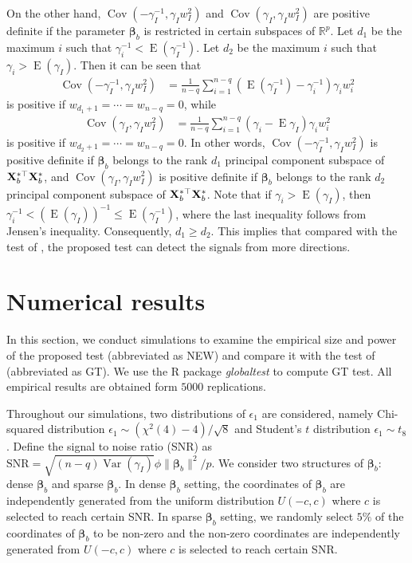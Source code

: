 \documentclass[11pt]{article}
\DeclareMathOperator{\myE}{E}
\DeclareMathOperator{\myVar}{Var}
\DeclareMathOperator{\myCov}{Cov}
\newcommand{\bfsym}[1]{\ensuremath{\boldsymbol{#1}}}
\def\bbeta{\bfsym \beta}
\theoremstyle{plain}
\theoremstyle{definition}
\theoremstyle{remark}
\begin{document}
On the other hand, $\myCov (-\gamma_I^{-1}, \gamma_I w_I^2)$ and $\myCov(\gamma_I, \gamma_I w_I^2)$ are positive definite if the parameter $\bbeta_b$ is restricted  in certain subspaces of $\mathbb R^p$.
Let $d_1$ be the maximum $i$ such that $ \gamma_i^{-1} < \myE (\gamma_I^{-1})$.
Let $d_2$ be the maximum $i$ such that $\gamma_i > \myE (\gamma_I) $.
Then it can be seen that
\begin{align*}
\myCov (-\gamma_I^{-1}, \gamma_I w_I^2)
&=
\frac{1}{n-q} \sum_{i=1}^{n-q} \left(\myE (\gamma_I^{-1})-\gamma_i^{-1} \right) \gamma_i w_i^2
\end{align*}
is positive if $w_{d_1+1}=\cdots =w_{n-q}=0$, while
\begin{align*}
    \myCov(\gamma_I, \gamma_I w_I^2)
&=
\frac{1}{n-q} \sum_{i=1}^{n-q} \left(\gamma_i - \myE \gamma_I \right) \gamma_i w_i^2
\end{align*}
is positive if $w_{d_2 + 1}=\cdots = w_{n-q}=0$.
In other words, $\myCov(-\gamma_I^{-1}, \gamma_I w_I^2)$ is positive definite if $\bbeta_b$ belongs to the rank $d_1$ principal component subspace of $\mathbf{X}_{b}^{*\top}\mathbf{X}_b^{*}$, and $\myCov(\gamma_I, \gamma_I w_I^2)$ is positive definite if $\bbeta_b$ belongs to the rank $d_2$ principal component subspace of $\mathbf{X}_{b}^{*\top}\mathbf{X}_b^{*}$.
Note that if $\gamma_i > \myE (\gamma_I)$, then $\gamma_i^{-1} < (\myE (\gamma_I))^{-1}\leq \myE (\gamma_I^{-1})$, where the last inequality follows from Jensen's inequality.
Consequently, $ d_1 \geq d_2 $.
This implies that compared with the test of \cite{Goeman2006}, the proposed test can detect the signals from more directions.



\section{Numerical results}\label{sec:Numerical}

In this section, we conduct simulations to examine the empirical size and power of the proposed test
(abbreviated as NEW) 
and compare it with the test of \cite{Goeman2006}
(abbreviated as GT).
We use the R package \emph{globaltest} to compute GT test.
All empirical results are obtained form $5000$ replications.



Throughout our simulations, two distributions of $\epsilon_1$ are considered, namely
        Chi-squared distribution $\epsilon_1 \sim (\chi^2(4)-4)/\sqrt 8$ and
        Student's $t$ distribution $\epsilon_1 \sim t_8$.
Define the signal to noise ratio (SNR) as $\text{SNR}=\sqrt{(n-q)\myVar (\gamma_I)} \phi \|\bbeta_b\|^2/p$.
We consider two structures of $\bbeta_b$: dense $\bbeta_b$ and sparse $\bbeta_b$.
In dense $\bbeta_b$ setting, the coordinates of $\bbeta_b$ are independently generated from the uniform distribution $U(-c, c)$ where $c$ is selected to reach certain SNR.
In sparse $\bbeta_b$ setting, we randomly select $5\%$ of the coordinates of $\bbeta_b$ to be non-zero and the non-zero coordinates are independently generated from $U(-c,c)$ where $c$ is selected to reach certain SNR.
\end{document}
